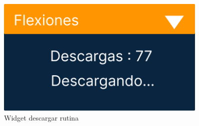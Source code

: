 \begin{figure}[H]
\begin{minipage}{0.45\textwidth}
      \label{fig:Rutinas de un usuario}
   \end{minipage}%
   \hspace{0.5cm}
   \begin{minipage}{0.45\textwidth}
      \centering
      \includegraphics[width=0.9\textwidth]{fotos/Frame 57.png}
      \caption{Widget descargar rutina}
      \label{fig:Widget descargar rutina}
   \end{minipage}
\end{figure}

